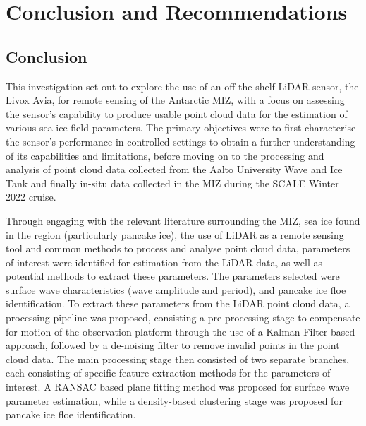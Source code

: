 \chapter{Conclusion and Recommendations}
\label{ch:conclusion}
\section{Conclusion}
\label{sec:ch9.section1}

This investigation set out to explore the use of an off-the-shelf \ac{LiDAR} sensor, the Livox Avia, for remote sensing of the Antarctic \ac{MIZ}, with a focus on assessing the sensor's capability to produce usable point cloud data for the estimation of various sea ice field parameters. The primary objectives were to first characterise the sensor's performance in controlled settings to obtain a further understanding of its capabilities and limitations, before moving on to the processing and analysis of point cloud data collected from the Aalto University Wave and Ice Tank and finally in-situ data collected in the \ac{MIZ} during the \ac{SCALE} Winter 2022 cruise.

Through engaging with the relevant literature surrounding the \ac{MIZ}, sea ice found in the region (particularly pancake ice), the use of \ac{LiDAR} as a remote sensing tool and common methods to process and analyse point cloud data, parameters of interest were identified for estimation from the \ac{LiDAR} data, as well as potential methods to extract these parameters. The parameters selected were surface wave characteristics (wave amplitude and period), and pancake ice floe identification. To extract these parameters from the \ac{LiDAR} point cloud data, a processing pipeline was proposed, consisting a pre-processing stage to compensate for motion of the observation platform through the use of a Kalman Filter-based approach, followed by a de-noising filter to remove invalid points in the point cloud data. The main processing stage then consisted of two separate branches, each consisting of specific feature extraction methods for the parameters of interest. A \ac{RANSAC} based plane fitting method was proposed for surface wave parameter estimation, while a density-based clustering stage was proposed for pancake ice floe identification.

